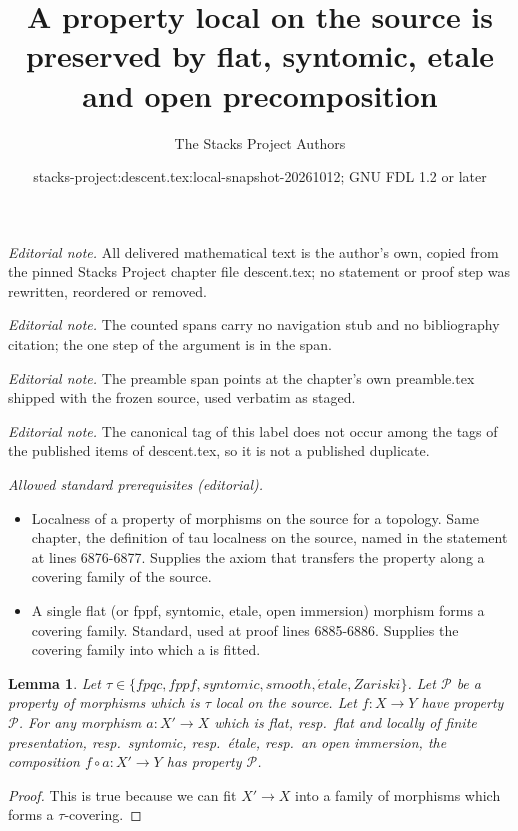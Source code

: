 \documentclass{stacks-project}
\title{A property local on the source is preserved by flat, syntomic, etale and open precomposition}
\author{The Stacks Project Authors}
\date{stacks-project:descent.tex:local-snapshot-20261012; GNU FDL 1.2 or later}
\theoremstyle{plain}
\newtheorem{lemma}[subsection]{Lemma}
\theoremstyle{definition}
\theoremstyle{remark}
\numberwithin{equation}{subsection}
\def\etale{{\acute{e}tale}}
\begin{document}
\maketitle
\noindent\textit{Editorial note.} All delivered mathematical text is the author's own, copied from the pinned Stacks Project chapter file descent.tex; no statement or proof step was rewritten, reordered or removed.\par\medskip
\noindent\textit{Editorial note.} The counted spans carry no navigation stub and no bibliography citation; the one step of the argument is in the span.\par\medskip
\noindent\textit{Editorial note.} The preamble span points at the chapter's own preamble.tex shipped with the frozen source, used verbatim as staged.\par\medskip
\noindent\textit{Editorial note.} The canonical tag of this label does not occur among the tags of the published items of descent.tex, so it is not a published duplicate.\par\medskip
\noindent\textit{Allowed standard prerequisites (editorial).}\begin{itemize}
\item Localness of a property of morphisms on the source for a topology. Same chapter, the definition of tau localness on the source, named in the statement at lines 6876-6877. Supplies the axiom that transfers the property along a covering family of the source.
\item A single flat (or fppf, syntomic, etale, open immersion) morphism forms a covering family. Standard, used at proof lines 6885-6886. Supplies the covering family into which a is fitted.
\end{itemize}\medskip
\begin{lemma}
\label{lemma-precompose-property-local-source}
Let $\tau \in \{fpqc, fppf, syntomic, smooth, \etale, Zariski\}$.
Let $\mathcal{P}$ be a property of morphisms which is $\tau$ local
on the source. Let $f : X \to Y$ have property $\mathcal{P}$.
For any morphism $a : X' \to X$ which is
flat, resp.\ flat and locally of finite presentation, resp.\ syntomic,
resp.\ \'etale, resp.\ an open immersion, the composition
$f \circ a : X' \to Y$ has property $\mathcal{P}$.
\end{lemma}

\begin{proof}
This is true because we can fit $X' \to X$ into a family of
morphisms which forms a $\tau$-covering.
\end{proof}
\end{document}
